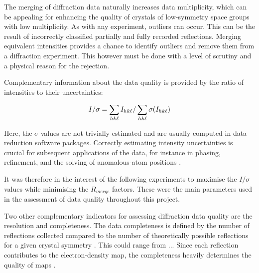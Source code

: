 The merging of diffraction data naturally increases data multiplicity, which can be appealing for enhancing the quality of crystals of low-symmetry space groups with low multiplicity. As with any experiment, outliers can occur. This can be the result of incorrectly classified partially and fully recorded reflections. Merging equivalent intensities provides a chance to identify outliers and remove them from a diffraction experiment. This however must be done with a level of scrutiny and a physical reason for the rejection.

Complementary information about the data quality is provided by the ratio of intensities to their uncertainties:

\begin{equation}
    I / \sigma = \sum_{hk\ell} I_{hk\ell}/\sum_{hk\ell} \sigma(I_{hk\ell})
\end{equation}

Here, the $\sigma$ values are not trivially estimated and are usually computed in data reduction software packages. Correctly estimating intensity uncertainties is crucial for subsequent applications of the data, for instance in phasing, refinement, and the solving of anomalous-atom positions \cite{Dauter1999}.  

It was therefore in the interest of the following experiments to maximise the $I / \sigma$ values while minimising the $R_{merge}$ factors. These were the main parameters used in the assessment of data quality throughout this project.

Two other complementary indicators for assessing diffraction data quality are the resolution and completeness. The data completeness is defined by the number of reflections collected compared to the number of theoretically possible reflections for a given crystal symmetry \cite{Arkhipova2017}. This could range from ... Since each reflection contributes to the electron-density map, the completeness heavily determines the quality of maps \cite{Wlodawer2007}.

